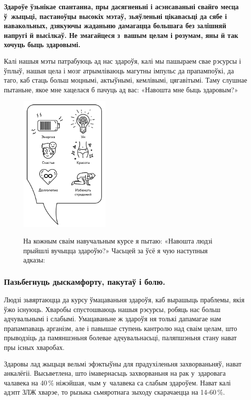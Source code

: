 \textbf{Здароўе ўзьнікае спантанна, пры дасягненьні і асэнсаваньні свайго месца ў~жыцьці, пастаноўцы высокіх мэтаў, зьяўленьні цікавасьці да сябе і навакольных, дзякуючы жаданьню дамагацца большага без залішняй напругі й высілкаў. Не змагайцеся з~вашым целам і розумам, яны й так хочуць быць здаровымі.}

Калі нашыя мэты патрабуюць ад нас здароўя, калі мы пашыраем свае рэсурсы і ўплыў, нашыя цела і мозг атрымліваюць магутны імпульс да прапампоўкі, да таго, каб стаць больш моцнымі, актыўнымі, кемлівымі, цягавітымі. Таму слушнае пытаньне, якое мне хацелася б пачуць ад вас: «Навошта мне быць здаровым?» 
\begin{figure}[htb!]
  \centering
  \includegraphics[width=0.4\textwidth]{willpower/pic1.png}

  На кожным сваім навучальным курсе я пытаю: «Навошта людзі прыйшлі вучыцца здароўю?» Часьцей за ўсё я чую наступныя адказы:
\end{figure}

\subsubsection{Пазьбегнуць дыскамфорту, пакутаў і болю.}

Людзі зьвяртаюцца да курсу ўмацаваньня здароўя, каб вырашыць праблемы, якія ўжо існуюць. Хваробы спустошваюць нашыя рэсурсы, робяць нас больш адчувальнымі і слабымі. Умацаваньне ж здароўя ня толькі дапамагае нам прапампаваць арганізм, але і павышае ступень кантролю над сваім целам, што прыводзіць да памяншэньня болевае адчувальнасьці, паляпшэньня стану нават пры існых хваробах.

Здаровы лад жыцьця вельмі эфэктыўны для прадухіленьня захворваньняў, нават анкалёгіі. Высьветлена, што імавернасьць захворваньня на рак у~здаровага чалавека на 40\,\% ніжэйшая, чым у~чалавека са слабым здароўем. Нават калі адэпт ЗЛЖ хварэе, то рызыка сьмяротнага зыходу скарачаецца на 14-60\,\%.

